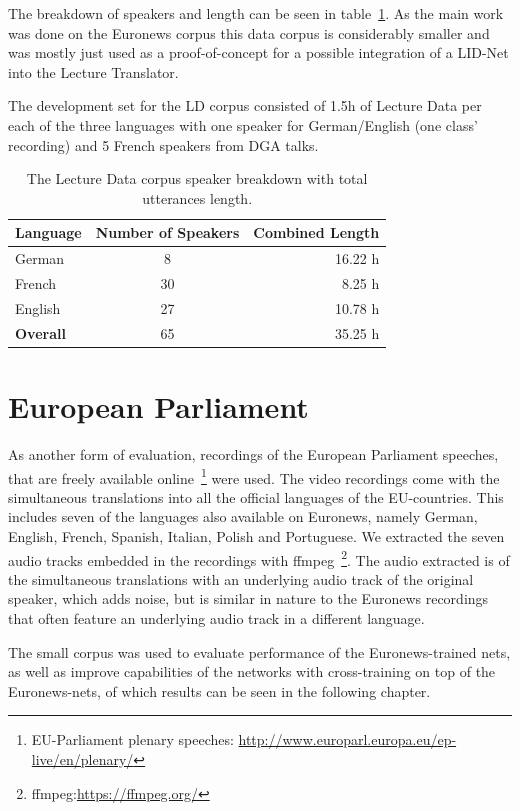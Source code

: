 The breakdown of speakers and length can be seen in table~\ref{tab:spkDataLD}. As the main work was done on the Euronews corpus this data corpus is considerably smaller and was mostly just used as a proof-of-concept for a possible integration of a LID-Net into the Lecture Translator. 

The development set for the LD corpus consisted of 1.5h of Lecture Data per each of the three languages with one speaker for German/English (one class' recording) and 5 French speakers from DGA talks.
\begin{table}[h!]
\caption{The Lecture Data corpus speaker breakdown with total utterances length.}
\label{tab:spkDataLD}
\centering
\begin{tabular}{| l | c | r | }
	\hline
	\textbf{Language} & \textbf{Number of Speakers} & \textbf{Combined Length} \\
	\hline
	German & 8 &  16.22 h \\
	French & 30 & 8.25 h \\  
	English & 27 & 10.78 h \\ 
	\hline
	\textbf{Overall} & 65 & 35.25 h\\
	\hline	
\end{tabular}
\end{table}

\section{European Parliament}
\label{sec:LITasks:EU}

As another form of evaluation, recordings of the European Parliament speeches, that are freely available online~\footnote{EU-Parliament plenary speeches: \url{http://www.europarl.europa.eu/ep-live/en/plenary/}} were used. The video recordings come with the simultaneous translations into all the official languages of the EU-countries.  This includes seven of the languages also available on Euronews, namely German, English, French, Spanish, Italian, Polish and Portuguese. We extracted the seven audio tracks embedded in the recordings with ffmpeg~\footnote{ffmpeg:\url{https://ffmpeg.org/}}. The audio extracted is of the simultaneous translations with an underlying audio track of the original speaker, which adds noise, but is similar in nature to the Euronews recordings that often feature an underlying audio track in a different language.

The small corpus was used to evaluate performance of the Euronews-trained nets, as well as improve capabilities of the networks with cross-training on top of the Euronews-nets, of which results can be seen in the following chapter.

